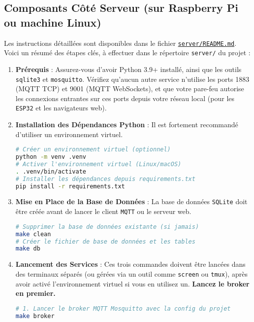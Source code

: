 \documentclass[12pt]{article}
\begin{document}
\subsection{Composants Côté Serveur (sur Raspberry Pi ou machine Linux)}

Les instructions détaillées sont disponibles dans le fichier \href{https://github.com/GreengagePlum/Project-IOT/blob/v1.0.0/server/README.md}{\texttt{server/README.md}}. Voici un résumé des étapes clés, à effectuer dans le répertoire \texttt{server/} du projet :

\begin{enumerate}
    \item \textbf{Prérequis} : Assurez-vous d'avoir Python 3.9+ installé, ainsi que les outils \texttt{sqlite3} et \texttt{mosquitto}. Vérifiez qu'aucun autre service n'utilise les ports 1883 (MQTT TCP) et 9001 (MQTT WebSockets), et que votre pare-feu autorise les connexions entrantes sur ces ports depuis votre réseau local (pour les \texttt{ESP32} et les navigateurs web).

    \item \textbf{Installation des Dépendances Python} : Il est fortement recommandé d'utiliser un environnement virtuel.
        \begin{lstlisting}[language=bash]
# Créer un environnement virtuel (optionnel)
python -m venv .venv
# Activer l'environnement virtuel (Linux/macOS)
. .venv/bin/activate
# Installer les dépendances depuis requirements.txt
pip install -r requirements.txt
        \end{lstlisting}

    \item \textbf{Mise en Place de la Base de Données} : La base de données \texttt{SQLite} doit être créée avant de lancer le client \texttt{MQTT} ou le serveur web.
        \begin{lstlisting}[language=bash]
# Supprimer la base de données existante (si jamais)
make clean
# Créer le fichier de base de données et les tables
make db
        \end{lstlisting}

    \item \textbf{Lancement des Services} : Ces trois commandes doivent être lancées dans des terminaux séparés (ou gérées via un outil comme \texttt{screen} ou \texttt{tmux}), après avoir activé l'environnement virtuel si vous en utilisez un. \textbf{Lancez le broker en premier.}
        \begin{lstlisting}[language=bash]
# 1. Lancer le broker MQTT Mosquitto avec la config du projet
make broker


\end{lstlisting}
\end{enumerate}
\end{document}
